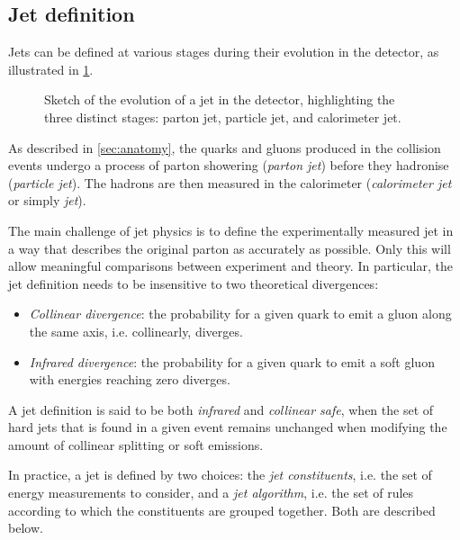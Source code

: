 \subsection{Jet definition}

Jets can be defined at various stages during their evolution in the detector, as illustrated in \cref{fig:jet-evolution}. 
\begin{figure}
    \caption{Sketch of the evolution of a jet in the detector, highlighting the three distinct stages: parton jet, particle jet, and calorimeter jet.}
    \label{fig:jet-evolution}
\end{figure}
As described in \cref{sec:anatomy}, the quarks and gluons produced in the collision events undergo a process of parton showering (\emph{parton jet}) before they hadronise (\emph{particle jet}). The hadrons are then measured in the calorimeter (\emph{calorimeter jet} or simply \emph{jet}). 

The main challenge of jet physics is to define the experimentally measured jet in a way that describes the original parton as accurately as possible. 
Only this will allow meaningful comparisons between experiment and theory. 
In particular, the jet definition needs to be insensitive to two theoretical divergences:
\begin{itemize}
    \item \emph{Collinear divergence}: the probability for a given quark to emit a gluon along the same axis, i.e. collinearly, diverges.
    \item \emph{Infrared divergence}: the probability for a given quark to emit a soft gluon with energies reaching zero diverges.
\end{itemize}
A jet definition is said to be both \emph{infrared} and \emph{collinear safe}, when the set of hard jets that is found in a given event remains unchanged when modifying the amount of collinear splitting or soft emissions.

In practice, a jet is defined by two choices: the \emph{jet constituents}, i.e. the set of energy measurements to consider, and a \emph{jet algorithm}, i.e. the set of rules according to which the constituents are grouped together.
Both are described below.

